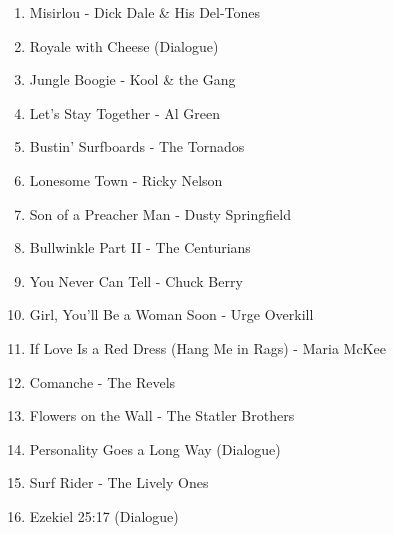 \documentclass[12pt]{article} %
\begin{document}
        \small
        \begin{enumerate}
            \item Misirlou - Dick Dale \& His Del-Tones
            \item Royale with Cheese (Dialogue)
            \item Jungle Boogie - Kool \& the Gang
            \item Let's Stay Together - Al Green
            \item Bustin' Surfboards - The Tornados
            \item Lonesome Town - Ricky Nelson
            \item Son of a Preacher Man - Dusty Springfield
            \item Bullwinkle Part II - The Centurians
            \item You Never Can Tell - Chuck Berry
            \item Girl, You'll Be a Woman Soon - Urge Overkill
            \item If Love Is a Red Dress (Hang Me in Rags) - Maria McKee
            \item Comanche - The Revels
            \item Flowers on the Wall - The Statler Brothers
            \item Personality Goes a Long Way (Dialogue)
            \item Surf Rider - The Lively Ones
            \item Ezekiel 25:17 (Dialogue)
        \end{enumerate}
        \break

            \normalsize
\end{document}

